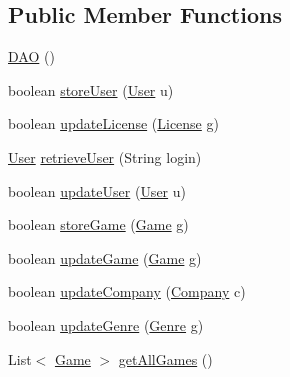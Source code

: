 \subsection*{Public Member Functions}
\begin{DoxyCompactItemize}
\item 
\hyperlink{classes_1_1deusto_1_1server_1_1db_1_1dao_1_1_d_a_o_a1f12a4ca454651d41896e45c42db8f90}{D\+AO} ()
\item 
boolean \hyperlink{classes_1_1deusto_1_1server_1_1db_1_1dao_1_1_d_a_o_acb146e96959c340ef828ef8e36b4283c}{store\+User} (\hyperlink{classes_1_1deusto_1_1server_1_1db_1_1data_1_1_user}{User} u)
\item 
boolean \hyperlink{classes_1_1deusto_1_1server_1_1db_1_1dao_1_1_d_a_o_a98774e8d93cdd4d8d104a197bd37d4e1}{update\+License} (\hyperlink{classes_1_1deusto_1_1server_1_1db_1_1data_1_1_license}{License} g)
\item 
\hyperlink{classes_1_1deusto_1_1server_1_1db_1_1data_1_1_user}{User} \hyperlink{classes_1_1deusto_1_1server_1_1db_1_1dao_1_1_d_a_o_a8c316b4c3bf246d00fb2b423a603ebe6}{retrieve\+User} (String login)
\item 
boolean \hyperlink{classes_1_1deusto_1_1server_1_1db_1_1dao_1_1_d_a_o_a7f6ed77294fe1f61cbebbea410cef6e0}{update\+User} (\hyperlink{classes_1_1deusto_1_1server_1_1db_1_1data_1_1_user}{User} u)
\item 
boolean \hyperlink{classes_1_1deusto_1_1server_1_1db_1_1dao_1_1_d_a_o_a7484309d9b9b39c24cd7d0413a90c468}{store\+Game} (\hyperlink{classes_1_1deusto_1_1server_1_1db_1_1data_1_1_game}{Game} g)
\item 
boolean \hyperlink{classes_1_1deusto_1_1server_1_1db_1_1dao_1_1_d_a_o_ae7540010b43f96c5e50995a8376614e7}{update\+Game} (\hyperlink{classes_1_1deusto_1_1server_1_1db_1_1data_1_1_game}{Game} g)
\item 
boolean \hyperlink{classes_1_1deusto_1_1server_1_1db_1_1dao_1_1_d_a_o_a0748467c3346a5bcdcd79b508562b6dc}{update\+Company} (\hyperlink{classes_1_1deusto_1_1server_1_1db_1_1data_1_1_company}{Company} c)
\item 
boolean \hyperlink{classes_1_1deusto_1_1server_1_1db_1_1dao_1_1_d_a_o_ae08384fb32fa6936c93f6292dbe02c7e}{update\+Genre} (\hyperlink{classes_1_1deusto_1_1server_1_1db_1_1data_1_1_genre}{Genre} g)
\item 
List$<$ \hyperlink{classes_1_1deusto_1_1server_1_1db_1_1data_1_1_game}{Game} $>$ \hyperlink{classes_1_1deusto_1_1server_1_1db_1_1dao_1_1_d_a_o_af49ed57bdac4dec48ab7616602d12df2}{get\+All\+Games} ()

\end{DoxyCompactItemize}
